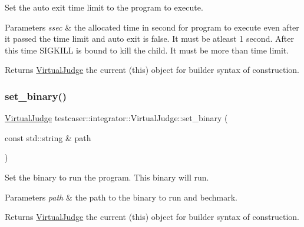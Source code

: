Set the auto exit time limit to the program to execute. 


\begin{DoxyParams}{Parameters}
{\em ssec} & the allocated time in second for program to execute even after it passed the time limit and auto exit is false. It must be atleast 1 second. After this time S\+I\+G\+K\+I\+LL is bound to kill the child. It must be more than time limit. \\
\hline
\end{DoxyParams}
\begin{DoxyReturn}{Returns}
\mbox{\hyperlink{classtestcaser_1_1integrator_1_1VirtualJudge}{Virtual\+Judge}} the current (this) object for builder syntax of construction. 
\end{DoxyReturn}
\mbox{\label{classtestcaser_1_1integrator_1_1VirtualJudge_aae183fb21dfffe38efcfb904d482b299}} 
\subsubsection{\texorpdfstring{set\_binary()}{set\_binary()}}
{\footnotesize\ttfamily \mbox{\hyperlink{classtestcaser_1_1integrator_1_1VirtualJudge}{Virtual\+Judge}} testcaser\+::integrator\+::\+Virtual\+Judge\+::set\+\_\+binary (\begin{DoxyParamCaption}\item[{const std\+::string \&}]{path }\end{DoxyParamCaption})\hspace{0.3cm}{\ttfamily [inline]}}



Set the binary to run the program. This binary will run. 


\begin{DoxyParams}{Parameters}
{\em path} & the path to the binary to run and bechmark. \\
\hline
\end{DoxyParams}
\begin{DoxyReturn}{Returns}
\mbox{\hyperlink{classtestcaser_1_1integrator_1_1VirtualJudge}{Virtual\+Judge}} the current (this) object for builder syntax of construction. 
\end{DoxyReturn}
\mbox{\label{classtestcaser_1_1integrator_1_1VirtualJudge_a2ac1d116076a4ee8fde3ddd1f0849309}} 
